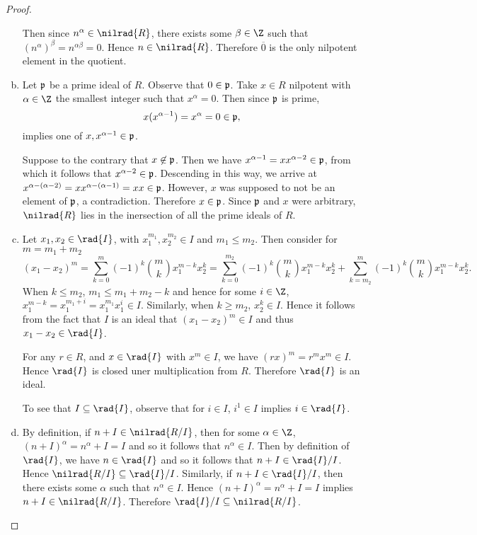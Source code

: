 \documentclass[10pt]{amsart}
\begin{document}
\begin{thm}
\begin{proof}
\begin{enumerate}[(a)]
      Then since $n^\alpha \in \nilrad{R}$, there exists some $\beta \in \Z$ such that $(n^\alpha)^\beta = n^{\alpha\beta} = 0$.
      Hence $n \in \nilrad{R}$.
      Therefore $\overline{0}$ is the only nilpotent element in the quotient.
    \item
      Let $\mathfrak{p}$ be a prime ideal of $R$.
      Observe that $0 \in \mathfrak{p}$.
      Take $x \in R$ nilpotent with $\alpha \in \Z$ the smallest integer such that $x^\alpha = 0$.
      Then since $\mathfrak{p}$ is prime,
      $$x(x^{\alpha - 1}) = x^\alpha = 0 \in \mathfrak{p},$$
      implies one of $x, x^{\alpha - 1} \in \mathfrak{p}$.
      
      Suppose to the contrary that $x \not \in \mathfrak{p}$.
      Then we have $x^{\alpha -1} = xx^{\alpha-2} \in \mathfrak{p}$, from which it follows that $x^{\alpha-2} \in \mathfrak{p}$.
      Descending in this way, we arrive at $x^{\alpha - (\alpha -2)} = xx^{\alpha - (\alpha - 1)} = xx \in \mathfrak{p}$.
      However, $x$ was supposed to not be an element of $\mathfrak{p}$, a contradiction.
      Therefore $x \in \mathfrak{p}$.
      Since $\mathfrak{p}$ and $x$ were arbitrary, $\nilrad{R}$ lies in the inersection of all the prime ideals of $R$.
    \item
      Let $x_1, x_2 \in \rad{I}$, with $x_1^{m_1}, x_2^{m_2} \in I$ and $m_1 \leq m_2$.
      Then consider for $m = m_1 + m_2$
      $$(x_1 - x_2)^m = \sum_{k=0}^m(-1)^k{m \choose k} x_1^{m-k}x_2^k = \sum_{k=0}^{m_2}(-1)^k{m \choose k} x_1^{m-k}x_2^k + \sum_{k=m_2}^m(-1)^k{m \choose k} x_1^{m-k}x_2^k.$$
      When $k \leq m_2$, $m_1 \leq m_1 + m_2 - k$ and hence for some $i \in \Z$, $x_1^{m-k} = x_1^{m_1 + i} = x_1^{m_1}x_1^i \in I$.
      Similarly, when $k \geq m_2$, $x_2^k \in I$.
      Hence it follows from the fact that $I$ is an ideal that $(x_1 - x_2)^m \in I$ and thus $x_1 - x_2 \in \rad{I}$.
      
      For any $r \in R$, and $x \in \rad{I}$ with $x^m \in I$, we have $(rx)^m = r^mx^m \in I$.
      Hence $\rad{I}$ is closed uner multiplication from $R$.
      Therefore $\rad{I}$ is an ideal.
      
      To see that $I \subseteq \rad{I}$, observe that for $i \in I$, $i^{1} \in I$ implies $i \in \rad{I}$.
    \item
      By definition, if $n + I \in \nilrad{R/I}$, then for some $\alpha \in \Z$, $(n + I)^\alpha = n^\alpha + I = I$ and so it follows that $n^\alpha \in I$.
      Then by definition of $\rad{I}$, we have $n \in \rad{I}$ and so it follows that $n + I \in \rad{I}/I$.
      Hence $\nilrad{R/I} \subseteq \rad{I}/I$.
      Similarly, if $n + I\in \rad{I}/I$, then there exists some $\alpha$ such that $n^\alpha \in I$.
      Hence $(n+I)^\alpha = n^\alpha + I = I$ implies $n + I \in \nilrad{R/I}$.
      Therefore $\rad{I}/I \subseteq \nilrad{R/I}$.
    \end{enumerate}
  \end{proof}
\end{thm}
\end{document}
